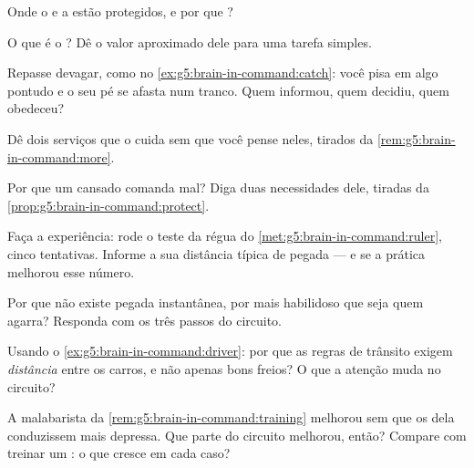 \begin{exercise}[$\star$]\label{exo:g5:brain-in-command:3}
Onde o  e a  estão protegidos, e por que ?
\end{exercise}

\begin{exercise}[$\star$]\label{exo:g5:brain-in-command:4}
O que é o ? Dê o valor aproximado dele para uma
tarefa simples.
\end{exercise}

\begin{exercise}[$\star$]\label{exo:g5:brain-in-command:5}
Repasse devagar, como no \cref{ex:g5:brain-in-command:catch}: você
pisa em algo pontudo e o seu pé se afasta num tranco. Quem informou,
quem decidiu, quem obedeceu?
\end{exercise}

\begin{exercise}[$\star$]\label{exo:g5:brain-in-command:6}
Dê dois serviços que o  cuida sem que você pense neles,
tirados da \cref{rem:g5:brain-in-command:more}.
\end{exercise}

\begin{exercise}[$\star$]\label{exo:g5:brain-in-command:7}
Por que um  cansado comanda mal? Diga duas necessidades dele,
tiradas da \cref{prop:g5:brain-in-command:protect}.
\end{exercise}

\begin{exercise}[$\star$]\label{exo:g5:brain-in-command:8}
Faça a experiência: rode o teste da régua do
\cref{met:g5:brain-in-command:ruler}, cinco tentativas. Informe a
sua distância típica de pegada --- e se a prática melhorou esse
número.
\end{exercise}

\begin{exercise}[$\star\star$]\label{exo:g5:brain-in-command:9}
Por que não existe pegada instantânea, por mais habilidoso que seja
quem agarra? Responda com os três passos do circuito.
\end{exercise}

\begin{exercise}[$\star\star$]\label{exo:g5:brain-in-command:10}
Usando o \cref{ex:g5:brain-in-command:driver}: por que as regras de
trânsito exigem \emph{distância} entre os carros, e não apenas bons
freios? O que a atenção muda no circuito?
\end{exercise}

\begin{exercise}[$\star\star\star$]\label{exo:g5:brain-in-command:11}
A malabarista da \cref{rem:g5:brain-in-command:training} melhorou
sem que os  dela conduzissem mais depressa. Que parte do
circuito melhorou, então? Compare com treinar um : o que
cresce em cada caso?
\end{exercise}
